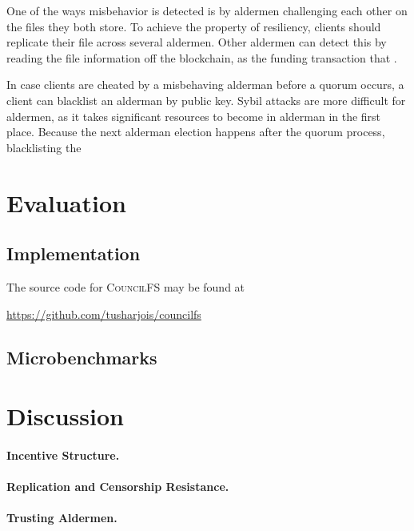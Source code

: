 \documentclass{article}
\begin{document}
One of the ways misbehavior is detected is by aldermen challenging each other on
the files they both store. To achieve the property of resiliency, clients should
replicate their file across several aldermen. Other aldermen can detect this by
reading the file information off the blockchain, as the funding transaction that
.

In case clients are cheated by a misbehaving alderman before a quorum occurs, a
client can blacklist an alderman by public key. Sybil attacks are more difficult
for aldermen, as it takes significant resources to become in alderman in the
first place. Because the next alderman election happens after the quorum
process, blacklisting the 

\section{Evaluation}

\subsection{Implementation}

The source code for \textsc{CouncilFS} may be found at
\begin{center}
  \url{https://github.com/tusharjois/councilfs}
\end{center}

\subsection{Microbenchmarks}

\section{Discussion}

\paragraph{Incentive Structure.}

\paragraph{Replication and Censorship Resistance.}

\paragraph{Trusting Aldermen.}
\end{document}

